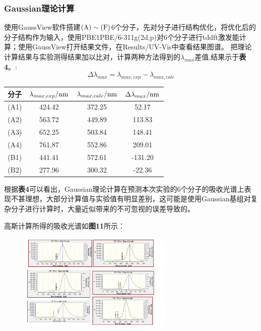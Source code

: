 \documentclass[12pt]{article}
\begin{document}
			\subsubsection{Gaussian理论计算}
			使用GaussView软件搭建$\rm (A)\sim (F)$6个分子，先对分子进行结构优化，将优化后的分子结构作为输入，使用PBE1PBE/6-311g(2d,p)对6个分子进行tddft激发能计算\citealp{ljr}；使用GaussView打开结果文件，在Results/UV-Vis中查看结果图谱。
			把理论计算结果与实验测得结果加以比对，计算两种方法得到的$\lambda_{max}$差值,结果示于\textbf{表4}。:
			$$\Delta\lambda_{max}=\lambda_{max, exp}-\lambda_{max, calc}
			$$
			\begin{table}[h]
				\centering
				\begin{tabular}{cccc}
					\toprule
					分子  & $\lambda_{max, exp}/{\rm nm} $ & $\lambda_{max, calc} / {\rm nm} $& $\Delta\lambda_{max}/{\rm nm} $  \\
					\midrule
					(A1) & 424.42 & 372.25 & 52.17 \\
					(A2) & 563.72 & 449.89 & 113.83 \\
					(A3) & 652.25 & 503.84 & 148.41 \\
					(A4) & 761.87 & 552.86 & 209.01 \\
					(B1) & 441.41 & 572.61 & -131.20 \\
					(B2) & 277.96 & 300.32 & -22.36\\		
					\bottomrule
				\end{tabular}
			\end{table}
			\par
			根据\textbf{表4}可以看出，Gaussian理论计算在预测本次实验的6个分子的吸收光谱上表现不甚理想，大部分计算值与实验值有明显差别，这可能是使用Gaussian基组对复杂分子进行计算时，大量近似带来的不可忽视的误差导致的。\par
			高斯计算所得的吸收光谱如\textbf{图11}所示：\par
			\begin{figure}[h]
				\centering
				\includegraphics[width=0.65\textwidth]{13.png}
			\end{figure}
			\par
			
\end{document}
